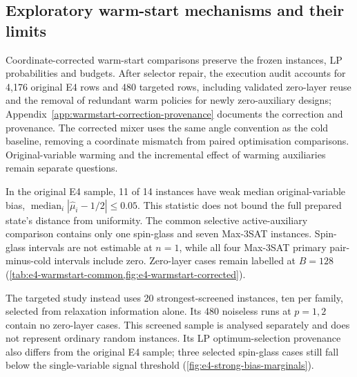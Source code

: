 \documentclass[a4paper,onecolumn,11pt,unpublished]{quantumarticle}
\theoremstyle{remark}
\begin{document}
\subsection{Exploratory warm-start mechanisms and their limits}
\label{sec:results-warmstart}

Coordinate-corrected warm-start comparisons preserve the frozen instances,
LP probabilities and budgets. After selector repair, the execution audit
accounts for 4,176 original E4 rows and 480 targeted rows, including
validated zero-layer reuse and the removal of redundant warm policies for
newly zero-auxiliary designs;
Appendix~\ref{app:warmstart-correction-provenance} documents the correction
and provenance.
The corrected mixer uses the same angle convention as the cold baseline,
removing a coordinate mismatch from paired optimisation comparisons.
Original-variable warming and the incremental effect of warming auxiliaries
remain separate questions.

In the original E4 sample, 11 of 14 instances have weak median
original-variable bias,
$\operatorname{median}_i|\widehat\mu_i-1/2|\leq0.05$.
This statistic does not bound the full prepared state's distance from
uniformity. The common selective active-auxiliary comparison contains only
one spin-glass and seven Max-3SAT instances. Spin-glass intervals are not
estimable at $n=1$, while all four Max-3SAT primary pair-minus-cold intervals
include zero. Zero-layer cases remain labelled
at $B=128$ (\cref{tab:e4-warmstart-common,fig:e4-warmstart-corrected}).

\label{sec:results-strong-bias-warmstart}
The targeted study instead uses 20 strongest-screened instances, ten per
family, selected from relaxation information alone. Its 480 noiseless
runs at $p=1,2$ contain no zero-layer cases. This screened sample is
analysed separately and does not represent ordinary random instances.
Its LP optimum-selection provenance also differs from the original E4
sample; three selected spin-glass cases still fall below the single-variable
signal threshold (\cref{fig:e4-strong-bias-marginals}).
\end{document}
